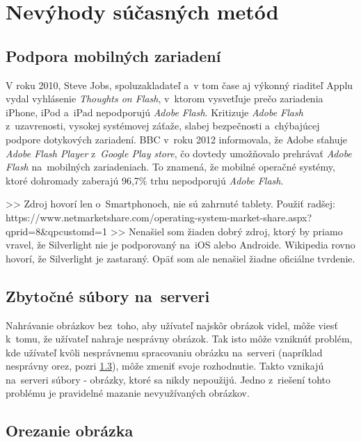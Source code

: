 \graphicspath{ {img/23/} }

\chapter{Nevýhody súčasných metód}
\section{Podpora mobilných zariadení}

V roku 2010, Steve Jobs, spoluzakladateľ a~v tom čase aj výkonný riaditeľ Applu vydal vyhlásenie \emph{Thoughts on Flash}\cite{Apple_flash}, v~ktorom vysvetľuje prečo zariadenia iPhone, iPod a~iPad nepodporujú \emph{Adobe Flash}. Kritizuje \emph{Adobe Flash} z~uzavrenosti, vysokej systémovej záťaže, slabej bezpečnosti a~chýbajúcej podpore dotykových zariadení.
BBC v~roku 2012 informovala\cite{Android_flash}, že Adobe sťahuje \emph{Adobe Flash Player} z~\emph{Google Play store}, čo dovtedy umožňovalo prehrávať \emph{Adobe Flash} na~mobilných zariadeniach. To znamená, že mobilné operačné systémy, ktoré dohromady zaberajú 96,7\% trhu\cite{Mobile_OS_share} nepodporujú \emph{Adobe Flash}.


>> Zdroj hovorí len o~Smartphonoch, nie sú zahrnuté tablety. Použiť radšej: https://www.netmarketshare.com/operating-system-market-share.aspx?qprid=8&qpcustomd=1
>> Nenašiel som žiaden dobrý zdroj, ktorý by priamo vravel, že Silverlight nie je podporovaný na~iOS alebo Androide. Wikipedia rovno hovorí, že Silverlight je zastaraný. Opäť som ale nenašiel žiadne oficiálne tvrdenie.


\section{Zbytočné súbory na~serveri}

Nahrávanie obrázkov bez~toho, aby užívateľ najskôr obrázok videl, môže viesť k~tomu, že užívateľ nahraje nesprávny obrázok. Tak isto môže vzniknúť problém, kde užívateľ kvôli nesprávnemu spracovaniu obrázku na~serveri (napríklad nesprávny orez, pozri \ref{sec:orezanie-obrazka}), môže zmeniť svoje rozhodnutie. Takto vznikajú na~serveri súbory - obrázky, ktoré sa nikdy nepoužijú. Jedno z~riešení tohto problému je pravidelné mazanie nevyužívaných obrázkov.   

\section{Orezanie obrázka}
\label{sec:orezanie-obrazka}

